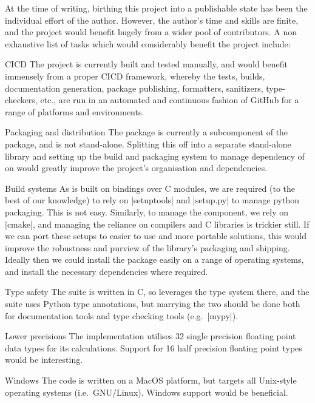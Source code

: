 At the time of writing, birthing this project into a publishable state has been the individual effort of the author. However, the author's time and skills are finite, and the project would benefit hugely from a wider pool of contributors. A non exhaustive list of tasks which would considerably benefit the project include: 
\begin{longdescription}
	\item[CICD] The project is currently built and tested manually, and would benefit immensely from a proper CICD framework, whereby the tests, builds, documentation generation, package publishing, formatters, sanitizers, type-checkers, etc., are run in an automated and continuous fashion of GitHub for a range of platforms and environments. 
	
	\item[Packaging and distribution] The \arv package is currently a subcomponent of the \pyarv package, and is not stand-alone. Splitting this off into a separate stand-alone library and setting up the build and packaging system to manage dependency of \pyarv on \arv would greatly improve the project's organisation and dependencies. 
	
	\item[Build systems] As \pyarv is built on bindings over C modules, we are required (to the best of our knowledge) to rely on \inlineplain|setuptools| and \inlineplain|setup.py| to manage python packaging. This is not easy. Similarly, to manage the \arv component, we rely on \inlineplain|cmake|, and managing the reliance on compilers and C libraries is trickier still. If we can port these setups to easier to use and more portable solutions, this would improve the robustness and purview of the library's packaging and shipping. Ideally then we could install the package easily on a range of operating systems, and install the necessary dependencies where required.
	
	\item[Type safety] The \arv suite is written in C, so leverages the type system there, and the \pyarv suite uses Python type annotations, but marrying the two should be done both for documentation tools and type checking tools (e.g.\ \inlineplain|mypy|).
	
	\item[Lower precisions] The implementation utilises \qty{32}{\bit} single precision floating point data types for its calculations. Support for \qty{16}{\bit} half precision floating point types would be interesting. 
	\item[Windows] The code is written on a MacOS platform, but targets all Unix-style operating systems (i.e.\ GNU/Linux). Windows support would be beneficial.  
	

\end{longdescription}
